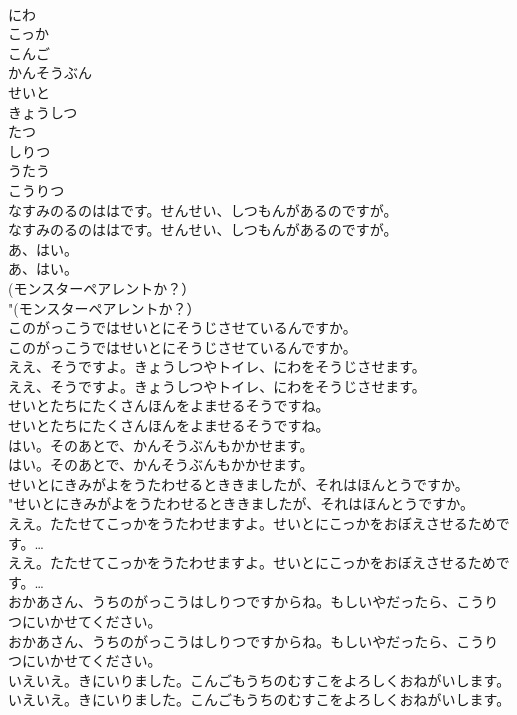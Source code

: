 \documentclass[8pt]{extreport}
\begin{document}
\begin{CJK}{UTF8}{min}
\\	にわ
\\	こっか
\\	こんご
\\	かんそうぶん
\\	せいと
\\	きょうしつ
\\	たつ
\\	しりつ
\\	うたう
\\	こうりつ
\\	なすみのるのははです。せんせい、しつもんがあるのですが。	
\\	なすみのるのははです。せんせい、しつもんがあるのですが。 
\\	あ、はい。	
\\	あ、はい。 
\\	(モンスターペアレントか？）	
\\	"(モンスターペアレントか？） 
\\	このがっこうではせいとにそうじさせているんですか。	
\\	このがっこうではせいとにそうじさせているんですか。 
\\	ええ、そうですよ。きょうしつやトイレ、にわをそうじさせます。	
\\	ええ、そうですよ。きょうしつやトイレ、にわをそうじさせます。 
\\	せいとたちにたくさんほんをよませるそうですね。	
\\	せいとたちにたくさんほんをよませるそうですね。 
\\	はい。そのあとで、かんそうぶんもかかせます。	
\\	はい。そのあとで、かんそうぶんもかかせます。 
\\	せいとにきみがよをうたわせるとききましたが、それはほんとうですか。	
\\	"せいとにきみがよをうたわせるとききましたが、それはほんとうですか。 
\\	ええ。たたせてこっかをうたわせますよ。せいとにこっかをおぼえさせるためです。…	
\\	ええ。たたせてこっかをうたわせますよ。せいとにこっかをおぼえさせるためです。… 
\\	おかあさん、うちのがっこうはしりつですからね。もしいやだったら、こうりつにいかせてください。	
\\	おかあさん、うちのがっこうはしりつですからね。もしいやだったら、こうりつにいかせてください。 
\\	いえいえ。きにいりました。こんごもうちのむすこをよろしくおねがいします。	
\\	いえいえ。きにいりました。こんごもうちのむすこをよろしくおねがいします。 

\end{CJK}
\end{document}
